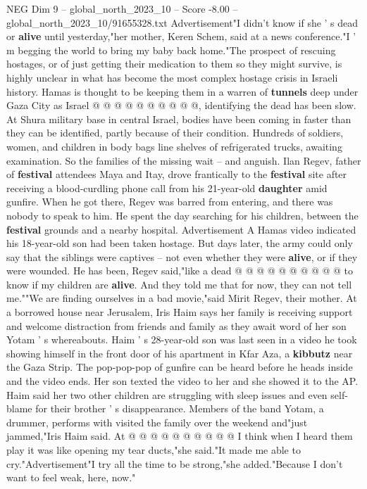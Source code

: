 \begin{textsample}{NEG Dim 9 – global\_north\_2023\_10 – Score -8.00 – global\_north\_2023\_10/91655328.txt}
Advertisement"I didn't know if she ' s dead or \textbf{alive} until yesterday,"her mother, Keren Schem, said at a news conference."I ' m begging the world to bring my baby back home."The prospect of rescuing hostages, or of just getting their medication to them so they might survive, is highly unclear in what has become the most complex hostage crisis in Israeli history.
Hamas is thought to be keeping them in a warren of \textbf{tunnels} deep under Gaza City as Israel @ @ @ @ @ @ @ @ @ @, identifying the dead has been slow.
At Shura military base in central Israel, bodies have been coming in faster than they can be identified, partly because of their condition.
Hundreds of soldiers, women, and children in body bags line shelves of refrigerated trucks, awaiting examination.
So the families of the missing wait -- and anguish.
Ilan Regev, father of \textbf{festival} attendees Maya and Itay, drove frantically to the \textbf{festival} site after receiving a blood-curdling phone call from his 21-year-old \textbf{daughter} amid gunfire.
When he got there, Regev was barred from entering, and there was nobody to speak to him.
He spent the day searching for his children, between the \textbf{festival} grounds and a nearby hospital.
Advertisement A Hamas video indicated his 18-year-old son had been taken hostage.
But days later, the army could only say that the siblings were captives -- not even whether they were \textbf{alive}, or if they were wounded.
He has been, Regev said,"like a dead @ @ @ @ @ @ @ @ @ @ to know if my children are \textbf{alive}.
And they told me that for now, they can not tell me.""We are finding ourselves in a bad movie,"said Mirit Regev, their mother.
At a borrowed house near Jerusalem, Iris Haim says her family is receiving support and welcome distraction from friends and family as they await word of her son Yotam ' s whereabouts.
Haim ' s 28-year-old son was last seen in a video he took showing himself in the front door of his apartment in Kfar Aza, a \textbf{kibbutz} near the Gaza Strip.
The pop-pop-pop of gunfire can be heard before he heads inside and the video ends.
Her son texted the video to her and she showed it to the AP.
Haim said her two other children are struggling with sleep issues and even self-blame for their brother ' s disappearance.
Members of the band Yotam, a drummer, performs with visited the family over the weekend and"just jammed,"Iris Haim said.
At @ @ @ @ @ @ @ @ @ @ I think when I heard them play it was like opening my tear ducts,"she said."It made me able to cry."Advertisement"I try all the time to be strong,"she added."Because I don't want to feel weak, here, now."

\end{textsample}
